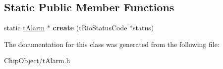 \subsection*{Static Public Member Functions}
\begin{DoxyCompactItemize}
\item 
\hypertarget{classnFPGA_1_1nFRC__2012__1__6__4_1_1tAlarm_ab6f39bea652e63de7827da74faa084e8}{
static \hyperlink{classnFPGA_1_1nFRC__2012__1__6__4_1_1tAlarm}{tAlarm} $\ast$ {\bfseries create} (tRioStatusCode $\ast$status)}
\label{classnFPGA_1_1nFRC__2012__1__6__4_1_1tAlarm_ab6f39bea652e63de7827da74faa084e8}

\end{DoxyCompactItemize}


The documentation for this class was generated from the following file:\begin{DoxyCompactItemize}
\item 
ChipObject/tAlarm.h\end{DoxyCompactItemize}
